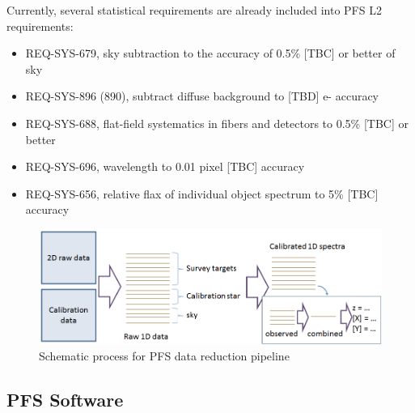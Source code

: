 \documentclass[a4paper,notitlepage]{article}
\begin{document}
Currently, several statistical requirements are already included 
into PFS L2 requirements: 
\begin{itemize}
  \item REQ-SYS-679, sky subtraction to the accuracy of 0.5\% [TBC] or better 
    of sky
  \item REQ-SYS-896 (890), subtract diffuse background to [TBD] e- accuracy
  \item REQ-SYS-688, flat-field systematics in fibers and detectors to 0.5\% 
    [TBC] or better
  \item REQ-SYS-696, wavelength to 0.01 pixel [TBC] accuracy
  \item REQ-SYS-656, relative flax of individual object spectrum to 5\% [TBC]
    accuracy
\end{itemize}

\begin{figure}[htb]
  \begin{center}
    \includegraphics[width=.75\linewidth]{sciops-scireq-drp-slide.png}
  \end{center}
  \caption{Schematic process for PFS data reduction pipeline}
  \label{fig:sciops-scireq-drp-slide}
\end{figure}



\subsection{PFS Software}
\end{document}
